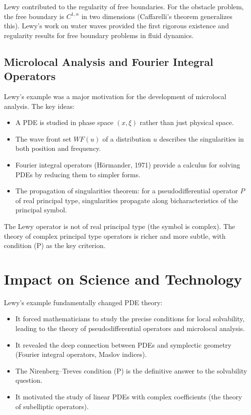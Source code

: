 Lewy contributed to the regularity of free boundaries. For the obstacle problem, the free boundary is $C^{1,\alpha}$ in two dimensions (Caffarelli's theorem generalizes this). Lewy's work on water waves provided the first rigorous existence and regularity results for free boundary problems in fluid dynamics.

\subsection{Microlocal Analysis and Fourier Integral Operators}

Lewy's example was a major motivation for the development of microlocal analysis. The key ideas:
\begin{itemize}
    \item A PDE is studied in phase space $(x, \xi)$ rather than just physical space.
    \item The wave front set $WF(u)$ of a distribution $u$ describes the singularities in both position and frequency.
    \item Fourier integral operators (H\"{o}rmander, 1971) provide a calculus for solving PDEs by reducing them to simpler forms.
    \item The propagation of singularities theorem: for a pseudodifferential operator $P$ of real principal type, singularities propagate along bicharacteristics of the principal symbol.
\end{itemize}

The Lewy operator is not of real principal type (the symbol is complex). The theory of complex principal type operators is richer and more subtle, with condition (P) as the key criterion.

\section{Impact on Science and Technology}

Lewy's example fundamentally changed PDE theory:
\begin{itemize}
    \item It forced mathematicians to study the precise conditions for local solvability, leading to the theory of pseudodifferential operators and microlocal analysis.
    \item It revealed the deep connection between PDEs and symplectic geometry (Fourier integral operators, Maslov indices).
    \item The Nirenberg--Treves condition (P) is the definitive answer to the solvability question.
    \item It motivated the study of linear PDEs with complex coefficients (the theory of subelliptic operators).
\end{itemize}

